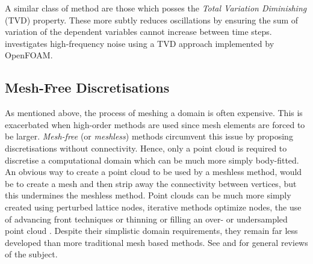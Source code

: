 A similar class of method are those which posses the \emph{Total Variation Diminishing} (TVD) property. These more subtly reduces oscillations by ensuring the sum of variation of the dependent variables cannot increase between time steps. \cite{eigemann2025AmplificationThermoacousticFlame} investigates high-frequency noise using a TVD approach implemented by OpenFOAM.



\subsection{Mesh-Free Discretisations}

As mentioned above, the process of meshing a domain is often expensive. This is exacerbated when high-order methods are used since mesh elements are forced to be larger. \emph{Mesh-free} (or \emph{meshless}) methods circumvent this issue by proposing discretisations without connectivity. Hence, only a point cloud is required to discretise a computational domain which can be much more simply body-fitted. An obvious way to create a point cloud to be used by a meshless method, would be to create a mesh and then strip away the connectivity between vertices, but this undermines the meshless method. Point clouds can be much more simply created using perturbed lattice nodes, iterative methods optimize nodes, the use of advancing front techniques or thinning or filling an over- or undersampled point cloud \cite{suchde2023PointCloudGeneration}. Despite their simplistic domain requirements, they remain far less developed than more traditional mesh based methods. See \cite{li2002MeshfreeParticleMethods} and \cite{garg2018MeshfreeMethodsComprehensive} for general reviews of the subject.

